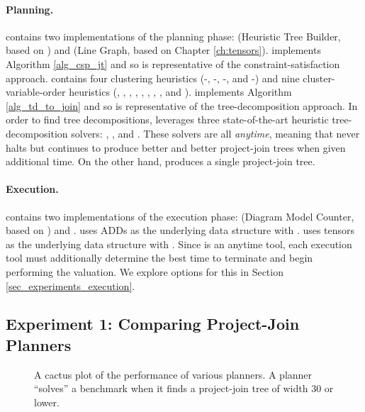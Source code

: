 \paragraph{Planning.} 
 contains two implementations of the planning phase: \Htb{} (Heuristic Tree Builder, based on  \cite{DPV20,phan2019weighted}) and \Lg{} (Line Graph, based on Chapter \ref{ch:tensors}).
\Htb{} implements Algorithm \ref{alg_csp_jt} and so is representative of the constraint-satisfaction approach.
\Htb{} contains four clustering heuristics (\Be-\ListH, \Be-\TreeH, \Bm-\ListH, and \Bm-\TreeH) and nine cluster-variable-order heuristics (\Random, \Mcs, \Invmcs, \Lexp, \Invlexp, \Lexm, \Invlexm, \Minfill, and \Invminfill).
\Lg{} implements Algorithm \ref{alg_td_to_join} and so is representative of the tree-decomposition approach.
In order to find tree decompositions, \Lg{} leverages three state-of-the-art heuristic tree-decomposition solvers: \Flowcutter{} \cite{strasser2017computing}, \Htd{} \cite{AMW17}, and \Tamaki{} \cite{Tamaki17}.
These solvers are all \emph{anytime}, meaning that \Lg{} never halts but continues to produce better and better project-join trees when given additional time.
On the other hand, \Htb{} produces a single project-join tree.

\paragraph{Execution.} 
 contains two implementations of the execution phase: \Dmc{} (Diagram Model Counter, based on  \cite{DPV20,phan2019weighted}) and \Tensor{}.
\Dmc{} uses ADDs as the underlying data structure with \cudd{} \cite{somenzi2015cudd}.
\Tensor{} uses tensors as the underlying data structure with \Numpy{} \cite{numpy}.
Since \Lg{} is an anytime tool, each execution tool must additionally determine the best time to terminate \Lg{} and begin performing the valuation.
We explore options for this in Section \ref{sec_experiments_execution}.


\subsection{Experiment 1: Comparing Project-Join Planners}
\label{sec_experiments_planning}

\begin{figure}[t]
	\centering
	
    \vspace*{-1cm}
	\caption{\label{fig:planning} A cactus plot of the performance of various planners.
	A planner ``solves'' a benchmark when it finds a project-join tree of width 30 or lower.}
\end{figure}

